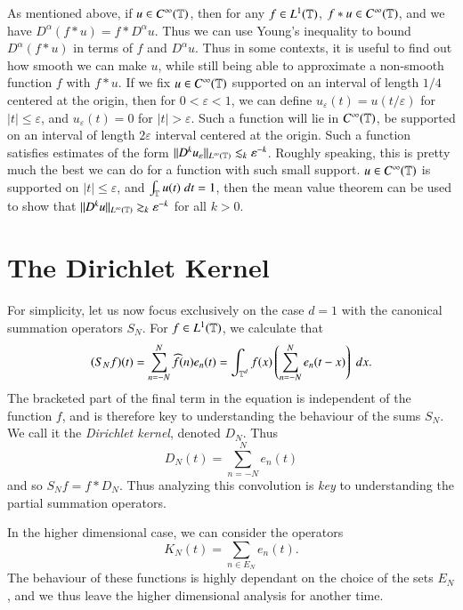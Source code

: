 As mentioned above, if $u \in C^\infty(\operatorname{\mathbb{T}})$, then for any $f \in L^1(\operatorname{\mathbb{T}})$, $f * u \in C^\infty(\operatorname{\mathbb{T}})$, and we have $D^\alpha(f * u) = f * D^\alpha u$. Thus we can use Young's inequality to bound $D^\alpha(f * u)$ in terms of $f$ and $D^\alpha u$. Thus in some contexts, it is useful to find out how smooth we can make $u$, while still being able to approximate a non-smooth function $f$ with $f * u$. If we fix $u \in C^\infty(\operatorname{\mathbb{T}})$ supported on an interval of length $1/4$ centered at the origin, then for $0 < \varepsilon < 1$, we can define $u_\varepsilon(t) = u(t/\varepsilon)$ for $|t| \leq \varepsilon$, and $u_\varepsilon(t) = 0$ for $|t| > \varepsilon$. Such a function will lie in $C^\infty(\operatorname{\mathbb{T}})$, be supported on an interval of length $2\varepsilon$ interval centered at the origin. Such a function satisfies estimates of the form $\| D^k u_\varepsilon \|_{L^\infty(\operatorname{\mathbb{T}})} \lesssim_k \varepsilon^{-k}$. Roughly speaking, this is pretty much the best we can do for a function with such small support. $u \in C^\infty(\operatorname{\mathbb{T}})$ is supported on $|t| \leq \varepsilon$, and $\int_{\operatorname{\mathbb{T}}} u(t)\; dt = 1$, then the mean value theorem can be used to show that $\| D^k u \|_{L^\infty(\operatorname{\mathbb{T}})} \gtrsim_k \varepsilon^{-k}$ for all $k > 0$.

\section{The Dirichlet Kernel}

For simplicity, let us now focus exclusively on the case $d = 1$ with the canonical summation operators $S_N$. For $f \in L^1(\operatorname{\mathbb{T}})$, we calculate that
%
\[ (S_Nf)(t) = \sum_{n = -N}^N \widehat{f}(n) e_n(t) = \int_{\operatorname{\mathbb{T}}^d} f(x) \left( \sum_{n = -N}^N e_n(t - x) \right)\; dx.  \]
%
The bracketed part of the final term in the equation is independent of the function $f$, and is therefore key to understanding the behaviour of the sums $S_N$. We call it the \emph{Dirichlet kernel}, denoted $D_N$. Thus
%
\[ D_N(t) = \sum_{n = -N}^N e_n(t) \]
%
and so $S_N f = f * D_N$. Thus analyzing this convolution is \emph{key} to understanding the partial summation operators.

\begin{remark}
    In the higher dimensional case, we can consider the operators
    \[ K_N(t) = \sum_{n \in E_N} e_n(t). \]
    The behaviour of these functions is highly dependant on the choice of the sets $E_N$, and we thus leave the higher dimensional analysis for another time.
\end{remark}


